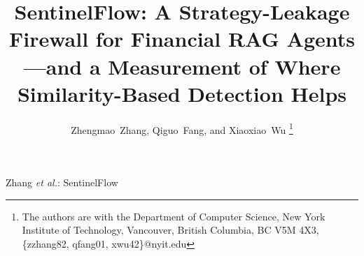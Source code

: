 \documentclass[journal]{IEEEtran}
\begin{document}

\title{SentinelFlow: A Strategy-Leakage Firewall for Financial RAG Agents---and a Measurement of Where Similarity-Based Detection Helps}

\author{Zhengmao~Zhang,
        Qiguo~Fang,
        and Xiaoxiao~Wu
\thanks{The authors are with the Department of Computer Science, 
New York Institute of Technology, Vancouver,
British Columbia, BC V5M 4X3, \{zzhang82, qfang01, xwu42\}@nyit.edu}
}

{Zhang \MakeLowercase{\textit{et al.}}: SentinelFlow}
\maketitle
\end{document}
